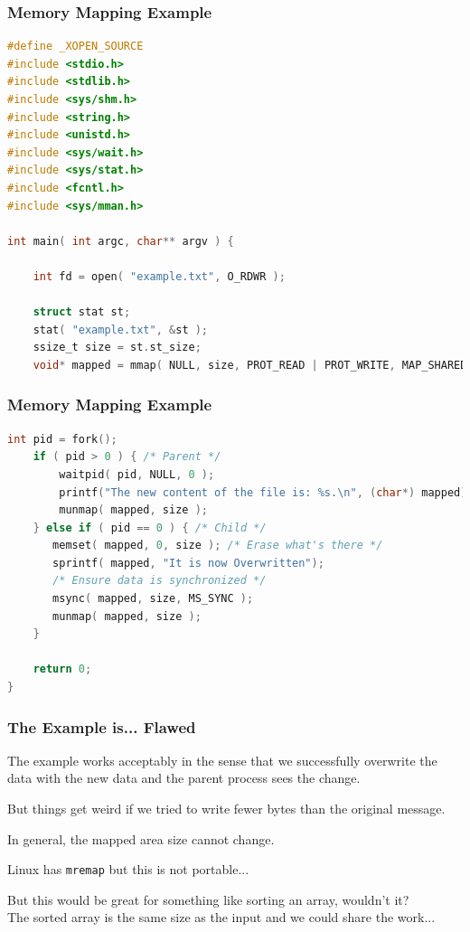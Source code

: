 \begin{frame}[fragile]
	\frametitle{Memory Mapping Example}

	\begin{lstlisting}[language=C]
#define _XOPEN_SOURCE
#include <stdio.h>
#include <stdlib.h>
#include <sys/shm.h>
#include <string.h>
#include <unistd.h>
#include <sys/wait.h>
#include <sys/stat.h>
#include <fcntl.h>
#include <sys/mman.h>

int main( int argc, char** argv ) { 

    int fd = open( "example.txt", O_RDWR );
    
    struct stat st; 
    stat( "example.txt", &st );
    ssize_t size = st.st_size;
    void* mapped = mmap( NULL, size, PROT_READ | PROT_WRITE, MAP_SHARED, fd, 0 );  
\end{lstlisting}
\end{frame}

\begin{frame}[fragile]
	\frametitle{Memory Mapping Example}

	\begin{lstlisting}[language=C]
    int pid = fork();
    if ( pid > 0 ) { /* Parent */
        waitpid( pid, NULL, 0 );
        printf("The new content of the file is: %s.\n", (char*) mapped);
        munmap( mapped, size );
    } else if ( pid == 0 ) { /* Child */
       memset( mapped, 0, size ); /* Erase what's there */
       sprintf( mapped, "It is now Overwritten");
       /* Ensure data is synchronized */
       msync( mapped, size, MS_SYNC );
       munmap( mapped, size );
    }

    return 0;
}
\end{lstlisting}

\end{frame}

\begin{frame}
	\frametitle{The Example is... Flawed}

	The example works acceptably in the sense that we successfully overwrite the data with the new data and the parent process sees the change.

	But things get weird if we tried to write fewer bytes than the original message.

	In general, the mapped area size cannot change.

	Linux has \texttt{mremap} but this is not portable...

	But this would be great for something like sorting an array, wouldn't it?\\
	\quad The sorted array is the same size as the input and we could share the work...

\end{frame}







